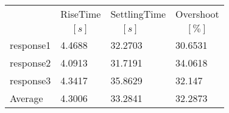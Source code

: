 \begin{tabular}{llll}
  & RiseTime & SettlingTime & Overshoot \\ 
  & $\;\;\;\;[s]$ & $\;\;\;\;[s]$ & $\;\;\;\;[\%]$  \\ 
\hline 
response1 & 4.4688 & 32.2703 & 30.6531  \\ 
response2 & 4.0913 & 31.7191 & 34.0618\\ 
response3 & 4.3417 & 35.8629 & 32.147  \\ 
Average & 4.3006 & 33.2841 & 32.2873 \\ 
\hline 
\end{tabular}